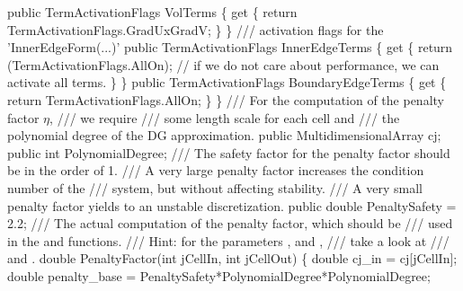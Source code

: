 {\btab public TermActivationFlags VolTerms \{\newline 
\btab \btab get \{\newline 
\btab \btab \btab return TermActivationFlags.GradUxGradV;\newline 
\btab \btab \}\newline 
\btab \}\newline 
    /// activation flags for the 'InnerEdgeForm(...)'
\btab public TermActivationFlags InnerEdgeTerms \{\newline 
\btab \btab get \{\newline 
\btab \btab \btab return (TermActivationFlags.AllOn);\newline 
\btab \btab \btab // if we do not care about performance, we can activate all terms.\newline 
\btab \btab \}\newline 
\btab \}\newline 
\btab public TermActivationFlags BoundaryEdgeTerms \{\newline 
\btab    get \{\newline 
\btab \btab    return TermActivationFlags.AllOn;\newline 
\btab \btab \}\newline 
\btab \}\newline 
    /// For the computation of the penalty factor $\eta$,
    /// we require
    /// some length scale for each cell and 
    /// the polynomial degree of the DG approximation.
\btab public MultidimensionalArray cj;\newline 
\btab public int PolynomialDegree;\newline 
    /// The safety factor for the penalty factor should be in the order of 1.
    /// A very large penalty factor increases the condition number of the 
    /// system, but without affecting stability.
    /// A very small penalty factor yields to an unstable discretization.
\btab public double PenaltySafety = 2.2; \newline 
    /// The actual computation of the penalty factor, which should be 
    /// used in the  and  functions.
    /// Hint: for the parameters ,  and ,
    /// take a look at
    ///  and .
\btab double PenaltyFactor(int jCellIn, int jCellOut) \{\newline 
\btab \btab double cj\_in        = cj[jCellIn];\newline 
\btab \btab double penalty\_base = PenaltySafety*PolynomialDegree*PolynomialDegree;\newline 
}
